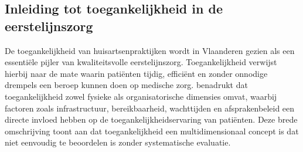




\subsection{Inleiding tot toegankelijkheid in de eerstelijnszorg}
\label{ter:Inleiding tot toegankelijkheid in de eerstelijnszorg}
De toegankelijkheid van huisartsenpraktijken wordt in Vlaanderen gezien als een essentiële pijler van kwaliteitsvolle eerstelijnszorg.
Toegankelijkheid verwijst hierbij naar de mate waarin patiënten tijdig, efficiënt en zonder onnodige drempels een beroep kunnen doen op medische zorg.
\textcite{Rampelberg2025} benadrukt dat toegankelijkheid zowel fysieke als organisatorische dimensies omvat, waarbij factoren zoals infrastructuur, bereikbaarheid, wachttijden en afsprakenbeleid een directe invloed hebben op de toegankelijkheidservaring van patiënten.
Deze brede omschrijving toont aan dat toegankelijkheid een multidimensionaal concept is dat niet eenvoudig te beoordelen is zonder systematische evaluatie.
\\\\
